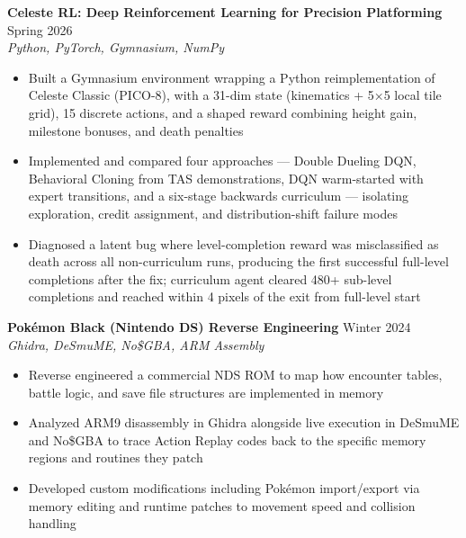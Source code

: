 \documentclass[10pt]{article}
\begin{document}
\vspace{3pt}

\textbf{Celeste RL: Deep Reinforcement Learning for Precision Platforming} \hfill Spring 2026 \\
\textit{Python, PyTorch, Gymnasium, NumPy}
\begin{itemize}[noitemsep, topsep=0pt, partopsep=0pt, parsep=0pt]
    \item Built a Gymnasium environment wrapping a Python reimplementation of Celeste Classic (PICO-8), with a 31-dim state (kinematics + 5×5 local tile grid), 15 discrete actions, and a shaped reward combining height gain, milestone bonuses, and death penalties
    \item Implemented and compared four approaches — Double Dueling DQN, Behavioral Cloning from TAS demonstrations, DQN warm-started with expert transitions, and a six-stage backwards curriculum — isolating exploration, credit assignment, and distribution-shift failure modes
    \item Diagnosed a latent bug where level-completion reward was misclassified as death across all non-curriculum runs, producing the first successful full-level completions after the fix; curriculum agent cleared 480+ sub-level completions and reached within 4 pixels of the exit from full-level start
\end{itemize}

\vspace{3pt}

\textbf{Pokémon Black (Nintendo DS) Reverse Engineering} \hfill Winter 2024 \\
\textit{Ghidra, DeSmuME, No\$GBA, ARM Assembly}
\begin{itemize}[noitemsep, topsep=0pt, partopsep=0pt, parsep=0pt]
    \item Reverse engineered a commercial NDS ROM to map how encounter tables, battle logic, and save file structures are implemented in memory
    \item Analyzed ARM9 disassembly in Ghidra alongside live execution in DeSmuME and No\$GBA to trace Action Replay codes back to the specific memory regions and routines they patch
    \item Developed custom modifications including Pokémon import/export via memory editing and runtime patches to movement speed and collision handling
\end{itemize}

\vspace{3pt}
\end{document}
